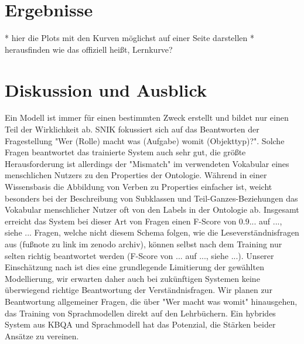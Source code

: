 \documentclass[utf8,biblatex]{lni}
\begin{document}
\section{Ergebnisse}

* hier die Plots mit den Kurven möglichst auf einer Seite darstellen
* herausfinden wie das offiziell heißt, Lernkurve?

\section{Diskussion und Ausblick}

Ein Modell ist immer für einen bestimmten Zweck erstellt und bildet nur einen Teil der Wirklichkeit ab.
SNIK fokussiert sich auf das Beantworten der Fragestellung "Wer (Rolle) macht was (Aufgabe) womit (Objekttyp)?".
Solche Fragen beantwortet das trainierte System auch sehr gut, die größte Herausforderung ist allerdings der "Mismatch" im verwendeten Vokabular eines menschlichen Nutzers zu den Properties der Ontologie.
Während in einer Wissensbasis die Abbildung von Verben zu Properties einfacher ist, weicht besonders bei der Beschreibung von Subklassen und Teil-Ganzes-Beziehungen das Vokabular menschlicher Nutzer oft von den Labels in der Ontologie ab.
Insgesamt erreicht das System bei dieser Art von Fragen  einen F-Score von 0.9... auf ..., siehe ...
Fragen, welche nicht diesem Schema folgen, wie die Leseverständnisfragen aus \cite{bb} (fußnote zu link im zenodo archiv), können selbst nach dem Training nur selten richtig beantwortet werden (F-Score von ... auf ..., siehe ...).
Unserer Einschätzung nach ist dies eine grundlegende Limitierung der gewählten Modellierung, wir erwarten daher auch bei zukünftigen Systemen keine überwiegend richtige Beantwortung der Verständnisfragen.
Wir planen zur Beantwortung allgemeiner Fragen, die über "Wer macht was womit" hinausgehen, das Training von Sprachmodellen direkt auf den Lehrbüchern.
Ein hybrides System aus KBQA und Sprachmodell hat das Potenzial, die Stärken beider Ansätze zu vereinen.

\printbibliography
\end{document}
